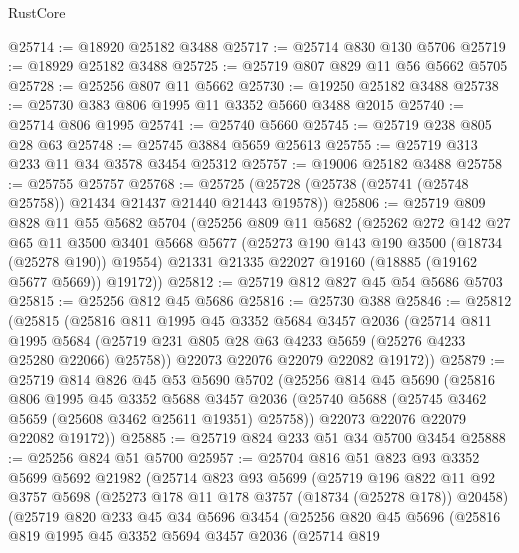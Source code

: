 \begin{lexlean}{RustCore}
\begin{coremodule}
@25714 := @18920 @25182 @3488
@25717 := @25714 @830 @130 @5706
@25719 := @18929 @25182 @3488
@25725 := @25719 @807 @829 @11 @56 @5662 @5705
@25728 := @25256 @807 @11 @5662
@25730 := @19250 @25182 @3488
@25738 := @25730 @383 @806 @1995 @11 @3352 @5660 @3488 @2015
@25740 := @25714 @806 @1995
@25741 := @25740 @5660
@25745 := @25719 @238 @805 @28 @63
@25748 := @25745 @3884 @5659 @25613
@25755 := @25719 @313 @233 @11 @34 @3578 @3454 @25312
@25757 := @19006 @25182 @3488
@25758 := @25755 @25757
@25768 := @25725 (@25728 (@25738 (@25741 (@25748 @25758)) @21434 @21437 @21440 @21443 @19578))
@25806 := @25719
    @809
    @828
    @11
    @55
    @5682
    @5704
    (@25256
      @809
      @11
      @5682
      (@25262
        @272
        @142
        @27
        @65
        @11
        @3500
        @3401
        @5668
        @5677
        (@25273 @190 @143 @190 @3500 (@18734 (@25278 @190)) @19554)
        @21331
        @21335
        @22027
        @19160
        (@18885 (@19162 @5677 @5669))
        @19172))
@25812 := @25719 @812 @827 @45 @54 @5686 @5703
@25815 := @25256 @812 @45 @5686
@25816 := @25730 @388
@25846 := @25812
    (@25815
      (@25816
        @811
        @1995
        @45
        @3352
        @5684
        @3457
        @2036
        (@25714
          @811
          @1995
          @5684
          (@25719 @231 @805 @28 @63 @4233 @5659 (@25276 @4233 @25280 @22066) @25758))
        @22073
        @22076
        @22079
        @22082
        @19172))
@25879 := @25719
    @814
    @826
    @45
    @53
    @5690
    @5702
    (@25256
      @814
      @45
      @5690
      (@25816
        @806
        @1995
        @45
        @3352
        @5688
        @3457
        @2036
        (@25740 @5688 (@25745 @3462 @5659 (@25608 @3462 @25611 @19351) @25758))
        @22073
        @22076
        @22079
        @22082
        @19172))
@25885 := @25719 @824 @233 @51 @34 @5700 @3454
@25888 := @25256 @824 @51 @5700
@25957 := @25704
    @816
    @51
    @823
    @93
    @3352
    @5699
    @5692
    @21982
    (@25714
      @823
      @93
      @5699
      (@25719
        @196
        @822
        @11
        @92
        @3757
        @5698
        (@25273 @178 @11 @178 @3757 (@18734 (@25278 @178)) @20458)
        (@25719
          @820
          @233
          @45
          @34
          @5696
          @3454
          (@25256
            @820
            @45
            @5696
            (@25816
              @819
              @1995
              @45
              @3352
              @5694
              @3457
              @2036
              (@25714
                @819

\end{coremodule}
\end{lexlean}
